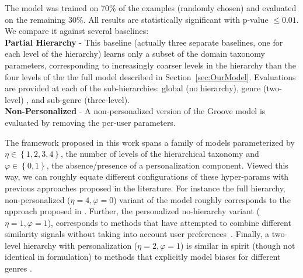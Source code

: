 The model was trained on 70\% of the examples (randomly chosen) and evaluated on the remaining 30\%. 
All results are statistically significant with p-value $\leq 0.01$.
We compare it against several baselines:\\
{\bf Partial Hierarchy} - This baseline (actually three separate baselines, one for each level of the hierarchy)  learns only a subset of the domain taxonomy parameters, corresponding to increasingly coarser levels in the hierarchy than the four levels of the the full model described in Section~\ref{sec:OurModel}. Evaluations are provided at each of the sub-hierarchies: global (no hierarchy), genre (two-level) , and sub-genre (three-level).\\
{\bf Non-Personalized} - A non-personalized version of the Groove model is evaluated by removing the per-user parameters.%

 The framework proposed in this work spans a family of models parameterized by $\eta\in\left\{1,2,3,4\right\}$, the number of levels of the hierarchical taxonomy and $\varphi\in\left\{0,1\right\}$, the absence/presence of a personalization component. Viewed this way, we can roughly equate different configurations of these hyper-params with previous approaches proposed in the literature. For instance the full hierarchy, non-personalized ($\eta=4,\varphi=0$) variant of the model roughly corresponds to the approach proposed in \cite{NIPS2012_4609}. Further, the personalized no-hierarchy variant ($\eta=1,\varphi=1$), corresponds to methods that have attempted to combine different similarity signals without taking into account user preferences~\cite{Knees:2006,McFee_multi_similarities}. Finally, a two-level hierarchy with personalization  ($\eta=2,\varphi=1$) is similar in spirit (though not identical in formulation) to methods that explicitly model biases for different genres \cite{Dror2011,Mnih2012}.

